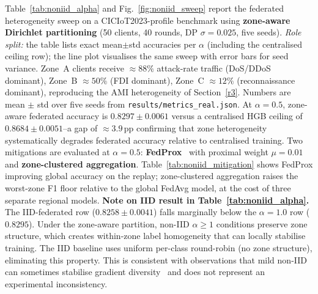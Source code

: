 \documentclass[sensors,article,submit,pdftex,moreauthors]{Definitions/mdpi}
\begin{document}
Table~\ref{tab:noniid_alpha} and Fig.~\ref{fig:noniid_sweep} report the federated heterogeneity sweep on a CICIoT2023-profile benchmark using \textbf{zone-aware Dirichlet partitioning} (50 clients, 40 rounds, DP $\sigma{=}0.025$, five seeds). \textit{Role split:} the table lists exact mean$\pm$std accuracies per $\alpha$ (including the centralised ceiling row); the line plot visualises the same sweep with error bars for seed variance. Zone~A clients receive ${\approx}88\%$ attack-rate traffic (DoS/DDoS dominant), Zone~B ${\approx}50\%$ (FDI dominant), Zone~C ${\approx}12\%$ (reconnaissance dominant), reproducing the AMI heterogeneity of Section~\ref{r3}. Numbers are mean $\pm$ std over five seeds from \texttt{results/metrics\_real.json}. At $\alpha{=}0.5$, zone-aware federated accuracy is $0.8297{\pm}0.0061$ versus a centralised HGB ceiling of $0.8684{\pm}0.0051$--a gap of ${\approx}3.9$\,pp confirming that zone heterogeneity systematically degrades federated accuracy relative to centralised training. Two mitigations are evaluated at $\alpha{=}0.5$: \textbf{FedProx}~\cite{li2020fedprox} with proximal weight $\mu{=}0.01$ and \textbf{zone-clustered aggregation}. Table~\ref{tab:noniid_mitigation} shows FedProx improving global accuracy on the replay; zone-clustered aggregation raises the worst-zone F1 floor relative to the global FedAvg model, at the cost of three separate regional models. \textbf{Note on IID result in Table~\ref{tab:noniid_alpha}.} The IID-federated row ($0.8258{\pm}0.0041$) falls marginally below the $\alpha{=}1.0$ row ($0.8295$). Under the zone-aware partition, non-IID $\alpha{\geq}1$ conditions preserve zone structure, which creates within-zone label homogeneity that can locally stabilise training. The IID baseline uses uniform per-class round-robin (no zone structure), eliminating this property. This is consistent with observations that mild non-IID can sometimes stabilise gradient diversity~\cite{li2020fedprox} and does not represent an experimental inconsistency.
\end{document}

